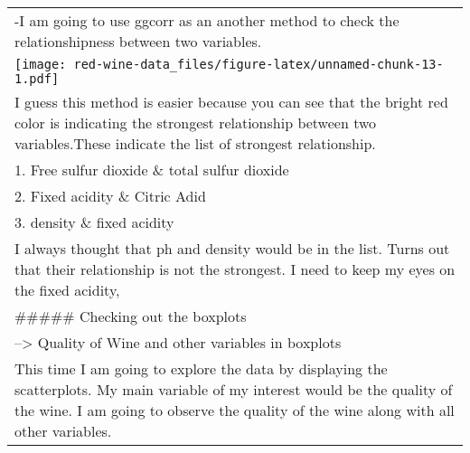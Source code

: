 \documentclass[]{article}
\begin{document}
\begin{longtable}[]{@{}l@{}}
\toprule
\begin{minipage}[t]{0.47\columnwidth}\raggedright\strut
-I am going to use ggcorr as an another method to check the
relationshipness between two variables.\strut
\end{minipage}\tabularnewline
\begin{minipage}[t]{0.47\columnwidth}\raggedright\strut
\texttt{[image: red-wine-data\_files/figure-latex/unnamed-chunk-13-1.pdf]}\strut
\end{minipage}\tabularnewline
\begin{minipage}[t]{0.47\columnwidth}\raggedright\strut
I guess this method is easier because you can see that the bright red
color is indicating the strongest relationship between two
variables.These indicate the list of strongest relationship.\strut
\end{minipage}\tabularnewline
\begin{minipage}[t]{0.47\columnwidth}\raggedright\strut
1. Free sulfur dioxide \& total sulfur dioxide\strut
\end{minipage}\tabularnewline
\begin{minipage}[t]{0.47\columnwidth}\raggedright\strut
2. Fixed acidity \& Citric Adid\strut
\end{minipage}\tabularnewline
\begin{minipage}[t]{0.47\columnwidth}\raggedright\strut
3. density \& fixed acidity\strut
\end{minipage}\tabularnewline
\begin{minipage}[t]{0.47\columnwidth}\raggedright\strut
I always thought that ph and density would be in the list. Turns out
that their relationship is not the strongest. I need to keep my eyes on
the fixed acidity,\strut
\end{minipage}\tabularnewline
\begin{minipage}[t]{0.47\columnwidth}\raggedright\strut
\#\#\#\#\# Checking out the boxplots\strut
\end{minipage}\tabularnewline
\begin{minipage}[t]{0.47\columnwidth}\raggedright\strut
--\textgreater{} Quality of Wine and other variables in boxplots\strut
\end{minipage}\tabularnewline
\begin{minipage}[t]{0.47\columnwidth}\raggedright\strut
This time I am going to explore the data by displaying the scatterplots.
My main variable of my interest would be the quality of the wine. I am
going to observe the quality of the wine along with all other variables.

\end{minipage}
\end{longtable}
\end{document}
